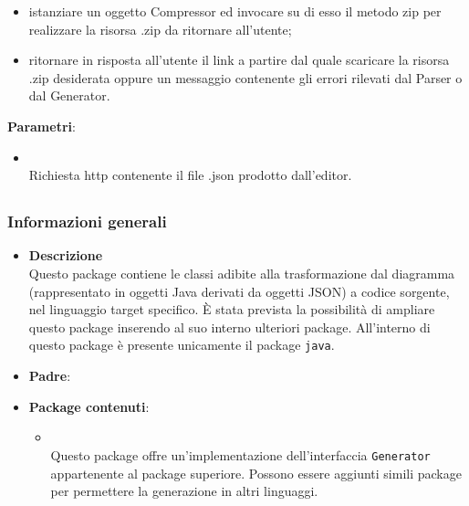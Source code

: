 \begin{itemize}
\begin{itemize}
\begin{itemize}
\item istanziare un oggetto Compressor ed invocare su di esso il metodo zip per realizzare la risorsa .zip da ritornare all'utente;
\item ritornare in risposta all'utente il link a partire dal quale scaricare la risorsa .zip desiderata oppure un messaggio contenente gli errori rilevati dal Parser o dal Generator.
\end{itemize}
\textbf{Parametri}:
\begin{itemize}
\item {}
\\ Richiesta http contenente il file .json prodotto dall'editor.
\end{itemize}
\end{itemize}
\end{itemize}
\subsection{}
\label{\nogloxy{swedesigner::server::generator}}
\subsubsection{Informazioni generali}
\begin{itemize}
\item \textbf{Descrizione}\\
Questo package contiene le classi adibite alla trasformazione dal diagramma (rappresentato in oggetti Java derivati da oggetti JSON) a codice sorgente, nel linguaggio target specifico. È stata prevista la possibilità di ampliare questo package inserendo al suo interno ulteriori package. All'interno di questo package è presente unicamente il package \texttt{java}.
\item \textbf{Padre}: \hyperref[\nogloxy{swedesigner::server}]{}
\item \textbf{Package contenuti}:
\begin{itemize}
\item \hyperref[\nogloxy{swedesigner::server::generator::java}]{}\\
Questo package offre un'implementazione dell'interfaccia \texttt{Generator} appartenente al package superiore. Possono essere aggiunti simili package per permettere la generazione in altri linguaggi.
\end{itemize}
\end{itemize}
